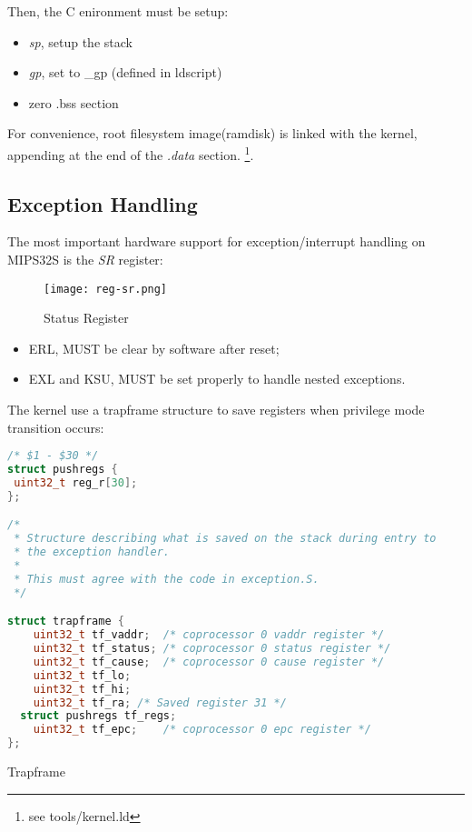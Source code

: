 \documentclass[a4paper]{article}
\begin{document}
Then, the C enironment must be setup:
\begin{itemize}
\item \emph{sp}, setup the stack
\item \emph{gp}, set to \_gp (defined in ldscript)
\item zero .bss section
\end{itemize}

For convenience, root filesystem image(ramdisk) is linked
with the kernel, appending at the end of the \emph{.data} section.
\footnote{see tools/kernel.ld}.

\subsection{Exception Handling}
The most important hardware support for exception/interrupt handling on MIPS32S is the \emph{SR}
register:

\begin{figure}[h]
\centering
\texttt{[image: reg-sr.png]}
\caption{Status Register\cite{Sweetman:2006:SMR:1210986}}
\label{fig:reg-sr}
\end{figure}

\begin{itemize}
\item ERL, MUST be clear by software after reset;
\item EXL and KSU, MUST be set properly to handle nested exceptions.
\end{itemize}

The kernel use a trapframe structure to save registers when privilege mode transition occurs:
\begin{algorithm}[h]
   \begin{lstlisting}[language={C++}]
/* $1 - $30 */
struct pushregs {
 uint32_t reg_r[30];
};

/*
 * Structure describing what is saved on the stack during entry to
 * the exception handler.
 *
 * This must agree with the code in exception.S.
 */

struct trapframe {
	uint32_t tf_vaddr;	/* coprocessor 0 vaddr register */
	uint32_t tf_status;	/* coprocessor 0 status register */
	uint32_t tf_cause;	/* coprocessor 0 cause register */
	uint32_t tf_lo;
	uint32_t tf_hi;
	uint32_t tf_ra;	/* Saved register 31 */
  struct pushregs tf_regs;
	uint32_t tf_epc;	/* coprocessor 0 epc register */
};

\end{lstlisting}
\caption{Trapframe}
\end{algorithm}
\end{document}

